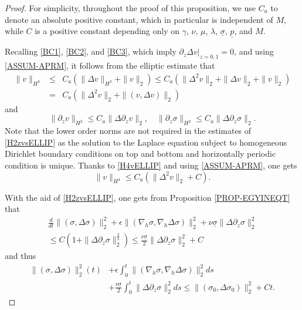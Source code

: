 \documentclass[12pt,reqno]{amsart}
\numberwithin{equation}{section}
\begin{document}
\begin{proof}
For simplicity, throughout the proof of this proposition, we use $C_a$ to denote an absolute positive constant, which in particular is
independent of $M$, while $C$ is a positive constant depending only on $\gamma$, $\nu$, $\mu$,
$\lambda$, $\underline\sigma$, $\underline p$, and $M$.

Recalling \eqref{BC1}, \eqref{BC2}, and \eqref{BC3}, which imply $\partial_z\Delta v|_{z=0,1}=0$, and using
\eqref{ASSUM-APRM}, it follows from the elliptic estimate that
\begin{eqnarray}
  \|v\|_{H^4}&\leq&{C_a} (\|\Delta v\|_{H^2}+\|v\|_2)\leq{C_a} (\|\Delta^2v\|_2+\|\Delta v\|_2+\|v\|_2)\nonumber\\
  &=& {C_a} (\|\Delta^2v\|_2+\|(v,\Delta v)\|_2)\label{H4vELLIP}
\end{eqnarray}
and
\begin{equation}
  \label{H2zvsELLIP}
  \|\partial_zv\|_{H^2}\leq {C_a}\|\Delta\partial_zv\|_2,\quad
\|\partial_z\sigma\|_{H^2}\leq {C_a}\|\Delta\partial_z\sigma\|_2.
\end{equation}
Note that the
lower order norms are not required in the estimates of \eqref{H2zvsELLIP} as the solution to the Laplace equation subject to
homogeneous Dirichlet boundary conditions on top and bottom and horizontally periodic condition is unique.
Thanks to \eqref{H4vELLIP} and using \eqref{ASSUM-APRM}, one gets
\begin{equation}
  \|v\|_{H^4}\leq {C_a}(\|\Delta^2v\|_2+C).\label{H4vELLIP-UnderM}
\end{equation}

With the aid of \eqref{H2zvsELLIP}, one gets from Proposition \ref{PROP-EGYINEQT} that
\begin{eqnarray*}
  \frac{d}{dt}\|(\sigma,\Delta\sigma)\|_2^2+\epsilon\|(\nabla_h\sigma,\nabla_h\Delta\sigma)\|_2^2+\nu\underline\sigma
  \|\Delta\partial_z\sigma\|_2^2\nonumber\\
  \leq C\left(1+\|\Delta\partial_z\sigma\|_2^\frac32\right)\leq\frac{\nu\underline\sigma}{2}\|\Delta\partial_z\sigma\|_2^2+C
\end{eqnarray*}
and thus
\begin{align}
  \|(\sigma,\Delta\sigma)\|_2^2(t)&+\epsilon\int_0^t\|(\nabla_h\sigma,\nabla_h\Delta\sigma)\|_2^2ds\nonumber\\
  &+\frac{\nu\underline\sigma}{2}\int_0^t\|
  \Delta\partial_z\sigma\|_2^2ds\leq\|(\sigma_0,\Delta\sigma_0)\|_2^2+Ct. \label{ESTs-UnderM}
\end{align}


\end{proof}
\end{document}
